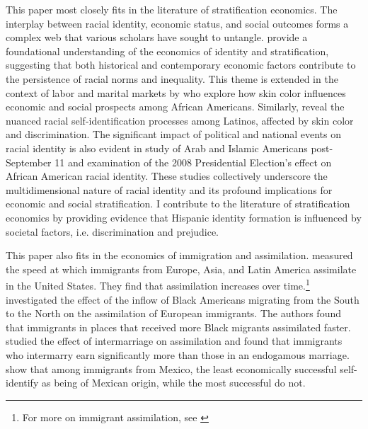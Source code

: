 \documentclass[12pt,english]{article}
\begin{document}
This paper most closely fits in the literature of stratification economics. The interplay between racial identity, economic status, and social outcomes forms a complex web that various scholars have sought to untangle. \textcite{darityEconomicsIdentityOrigin2006,darityPositionPossessionsStratification2022} provide a foundational understanding of the economics of identity and stratification, suggesting that both historical and contemporary economic factors contribute to the persistence of racial norms and inequality. This theme is extended in the context of labor and marital markets by \textcite{goldsmithDarkLightSkin2007,hamiltonSheddingLightMarriage2009,dietteSkinShadeStratification2015} who explore how skin color influences economic and social prospects among African Americans. Similarly, \textcite{golash-bozaLatinoRacialChoices2008} reveal the nuanced racial self-identification processes among Latinos, affected by skin color and discrimination. The significant impact of political and national events on racial identity is also evident in \textcite{masonStigmatizationRacialSelection2014} study of Arab and Islamic Americans post-September 11 and \textcite{masonNotBlackAlone20082017} examination of the 2008 Presidential Election's effect on African American racial identity. These studies collectively underscore the multidimensional nature of racial identity and its profound implications for economic and social stratification. I contribute to the literature of stratification economics by providing evidence that Hispanic identity formation is influenced by societal factors, i.e. discrimination and prejudice. 

This paper also fits in the economics of immigration and assimilation. \textcite{abramitzkyCulturalAssimilationAge2016} measured the speed at which immigrants from Europe, Asia, and Latin America assimilate in the United States. They find that assimilation increases over time.\footnote{For more on immigrant assimilation, see \textcite{abramitzkyLeavingEnclaveHistorical2020,abramitzkyIntergenerationalMobilityImmigrants2019,abramitzkyDiscriminationReturnsCultural2020,abramitzkyNationImmigrantsAssimilation2014}} \textcite{foukaImmigrantsAmericansRace2022} investigated the effect of the inflow of Black Americans migrating from the South to the North on the assimilation of European immigrants. The authors found that immigrants in places that received more Black migrants assimilated faster.  \textcite{mengIntermarriageEconomicAssimilation2005} studied the effect of intermarriage on assimilation and found that immigrants who intermarry earn significantly more than those in an endogamous marriage. \textcite{antmanEthnicAttritionObserved2016} show that among immigrants from Mexico, the least economically successful self-identify as being of Mexican origin, while the most successful do not.
\end{document}

